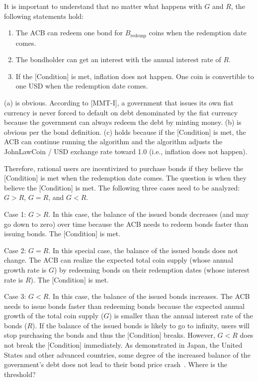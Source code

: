 \documentclass[dvipdfmx,a4paper]{article}
\begin{document}
It is important to understand that no matter what happens with $G$ and $R$, the following statements hold:

\begin{enumerate}
\renewcommand{\labelenumi}{(\alph{enumi})}
\item The ACB can redeem one bond for $B_{\mathrm{redemp}}$ coins when the redemption date comes.
\item The bondholder can get an interest with the annual interest rate of $R$.
\item If the [Condition] is met, inflation does not happen. One coin is convertible to one USD when the redemption date comes.
\end{enumerate}

(a) is obvious. According to [MMT-I], a government that issues its own fiat currency is never forced to default on debt denominated by the fiat currency because the government can always redeem the debt by minting money. (b) is obvious per the bond definition. (c) holds because if the [Condition] is met, the ACB can continue running the algorithm and the algorithm adjusts the JohnLawCoin / USD exchange rate toward 1.0 (i.e., inflation does not happen).

Therefore, rational users are incentivized to purchase bonds if they believe the [Condition] is met when the redemption date comes. The question is when they believe the [Condition] is met. The following three cases need to be analyzed: $G>R$, $G=R$, and $G<R$.

Case 1: $G>R$. In this case, the balance of the issued bonds decreases (and may go down to zero) over time because the ACB needs to redeem bonds faster than issuing bonds. The [Condition] is met.

Case 2: $G=R$. In this special case, the balance of the issued bonds does not change. The ACB can realize the expected total coin supply (whose annual growth rate is $G$) by redeeming bonds on their redemption dates (whose interest rate is $R$). The [Condition] is met.

Case 3: $G<R$. In this case, the balance of the issued bonds increases. The ACB needs to issue bonds faster than redeeming bonds because the expected annual growth of the total coin supply ($G$) is smaller than the annual interest rate of the bonds ($R$). If the balance of the issued bonds is likely to go to infinity, users will stop purchasing the bonds and thus the [Condition] breaks. However, $G<R$ does not break the [Condition] immediately. As demonstrated in Japan, the United States and other advanced countries, some degree of the increased balance of the government's debt does not lead to their bond price crash~\cite{elmendorf1999government}. Where is the threshold?
\end{document}
